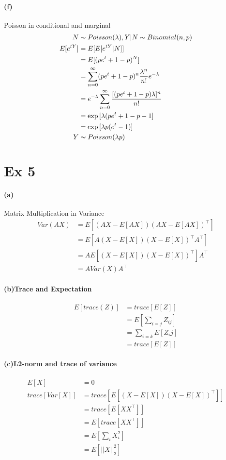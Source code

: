\documentclass[11pt, letterpaper]{article}
\begin{document}
\paragraph{(f)} Poisson in conditional and marginal
\begin{align*}
    N &\thicksim Poisson(\lambda), Y|N \thicksim Binomial(n, p) \\
    E[e^{tY}] &= E[E[e^{tY}|N]] \\
        &= E[(pe^t + 1 - p)^N] \\
        &= \sum_{n=0}^{\infty} (pe^t + 1 - p)^n \frac{\lambda^n}{n!} e^{-\lambda} \\
        &= e^{-\lambda} \sum_{n=0}^{\infty} \frac{[(pe^t + 1 - p)\lambda]^n}{n!} \\
        &= \exp{[\lambda(pe^t+1-p-1]} \\
        &= \exp{[\lambda p (e^t - 1)]} \\
      Y &\thicksim Poisson(\lambda p)
\end{align*}

\section{Ex 5}
\paragraph{(a)}Matrix Multiplication in Variance
\begin{align*}
    Var(AX) &= E[(AX - E[AX])(AX - E[AX])^{\intercal}] \\
        &= E[A(X - E[X])(X - E[X])^{\intercal}A^{\intercal}] \\
        &= A E[(X - E[X])(X - E[X])^{\intercal}] A^{\intercal} \\
        &= A Var(X) A^{\intercal}
\end{align*}
\paragraph{(b)Trace and Expectation}
\begin{align*}
    E[trace(Z)] &= trace[E[Z]] \\
        &= E[\sum_{i=j} Z_{ij}] \\
        &= \sum_{i=k} E[Z_ij] \\
        &= trace[E[Z]]
\end{align*}
\paragraph{(c)L2-norm and trace of variance}
\begin{align*}
    E[X] &= 0 \\
    trace[Var[X]] &= trace[E[(X-E[X])(X-E[X])^{\intercal}]] \\
        &= trace[E[XX^{\intercal}]] \\
        &= E[trace[XX^\intercal]] \\
        &= E[\sum_i X_{i}^2] \\
        &= E[||X||^2_2]
\end{align*}
\end{document}

